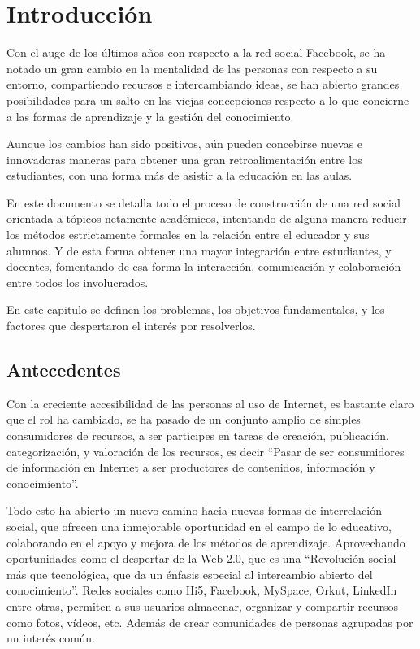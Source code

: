 \chapter{Introducción}

Con el auge de los últimos años con respecto a la red social
Facebook\cite{Jeria}, se ha notado un gran cambio en la mentalidad de las
personas con respecto a su entorno, compartiendo recursos e intercambiando
ideas, se han abierto grandes posibilidades para un salto en las viejas
concepciones respecto a lo que concierne a las formas de aprendizaje y la
gestión del conocimiento.

Aunque los cambios han sido positivos, aún pueden concebirse nuevas e
innovadoras maneras para obtener una gran retroalimentación entre los
estudiantes, con una forma más de asistir a la educación en las aulas.

En este documento se detalla todo el proceso de construcción de una red social
orientada a tópicos netamente académicos, intentando de alguna manera reducir
los métodos estrictamente formales en la relación entre el educador y sus
alumnos. Y de esta forma obtener una mayor integración entre estudiantes, y
docentes, fomentando de esa forma la interacción, comunicación y colaboración
entre todos los involucrados.

En este capitulo se definen los problemas, los objetivos fundamentales, y los
factores que despertaron el interés por resolverlos.

\section{Antecedentes}
Con la creciente accesibilidad de las personas al uso de Internet, es bastante
claro que el rol ha cambiado, se ha pasado de un conjunto amplio de simples
consumidores de recursos, a ser participes en tareas de creación, publicación,
categorización, y valoración de los recursos, es decir “Pasar de ser
consumidores de información en Internet a ser productores de contenidos,
información y conocimiento”\cite{Rodriguez}.

Todo esto ha abierto un nuevo camino hacia nuevas formas de interrelación
social, que ofrecen una inmejorable oportunidad en el campo de lo educativo,
colaborando en el apoyo y mejora de los métodos de aprendizaje. Aprovechando
oportunidades como el despertar de la Web 2.0, que es una “Revolución social
más que tecnológica, que da un énfasis especial al intercambio abierto del
conocimiento”\cite{Rodriguez}. Redes sociales como Hi5, Facebook, MySpace,
Orkut, LinkedIn entre otras, permiten a sus usuarios almacenar, organizar y
compartir recursos como fotos, vídeos, etc. Además de crear comunidades de
personas agrupadas por un interés común.

